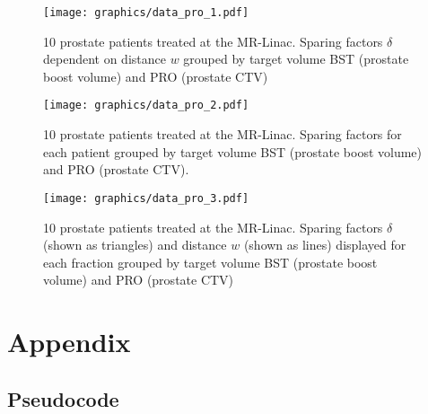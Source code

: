 \documentclass[\relativeRoot/ada.tex]{subfiles}
\begin{document}
\begin{figure}[!htb]
    \centering
    \texttt{[image: graphics/data\_pro\_1.pdf]}
    \caption{10 prostate patients treated at the MR-Linac. Sparing factors $\delta$ dependent on distance $w$ grouped by target volume BST (prostate boost volume) and PRO (prostate CTV)}
    \label{fig:data_pro_1}
\end{figure}

\begin{figure}[!htb]
    \centering
    \texttt{[image: graphics/data\_pro\_2.pdf]}
    \caption{10 prostate patients treated at the MR-Linac. Sparing factors for each patient grouped by target volume BST (prostate boost volume) and PRO (prostate CTV).}
    \label{fig:data_pro_2}
\end{figure}

\begin{figure}[!htb]
    \centering
    \texttt{[image: graphics/data\_pro\_3.pdf]}
    \caption{10 prostate patients treated at the MR-Linac. Sparing factors $\delta$ (shown as triangles) and distance $w$ (shown as lines) displayed for each fraction grouped by target volume BST (prostate boost volume) and PRO (prostate CTV)}
    \label{fig:data_pro_3}
\end{figure}



\clearpage
\newpage

\printbibliography{}

\onecolumn
\newpage
\clearpage
\pagestyle{empty}

\section*{Appendix}

%


\renewcommand{\thesubsection}{\Alph{subsection}}
\renewcommand\thefigure{\thesubsection.\arabic{figure}}

\setcounter{figure}{0}
\setcounter{subsection}{0}

\subsection{Pseudocode}\label{sec:pseudocode}
\end{document}
